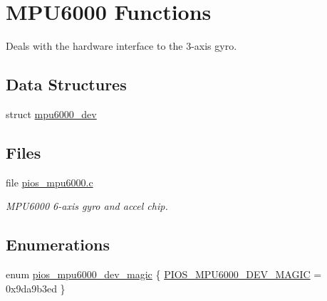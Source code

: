 \hypertarget{group___p_i_o_s___m_p_u6000}{\section{\-M\-P\-U6000 \-Functions}
\label{group___p_i_o_s___m_p_u6000}
}


\-Deals with the hardware interface to the 3-\/axis gyro.  


\subsection*{\-Data \-Structures}
\begin{DoxyCompactItemize}
\item 
struct \hyperlink{structmpu6000__dev}{mpu6000\-\_\-dev}
\end{DoxyCompactItemize}
\subsection*{\-Files}
\begin{DoxyCompactItemize}
\item 
file \hyperlink{pios__mpu6000_8c}{pios\-\_\-mpu6000.\-c}
\begin{DoxyCompactList}\small\item\em \-M\-P\-U6000 6-\/axis gyro and accel chip. \end{DoxyCompactList}\end{DoxyCompactItemize}
\subsection*{\-Enumerations}
\begin{DoxyCompactItemize}
\item 
enum \hyperlink{group___p_i_o_s___m_p_u6000_gacec1373b8d76d996eacbadde2698c1ee}{pios\-\_\-mpu6000\-\_\-dev\-\_\-magic} \{ \hyperlink{group___p_i_o_s___m_p_u6000_ggacec1373b8d76d996eacbadde2698c1eea5819766babadd675342ed58f91a0d1fd}{\-P\-I\-O\-S\-\_\-\-M\-P\-U6000\-\_\-\-D\-E\-V\-\_\-\-M\-A\-G\-I\-C} =  0x9da9b3ed
 \}
\end{DoxyCompactItemize}
